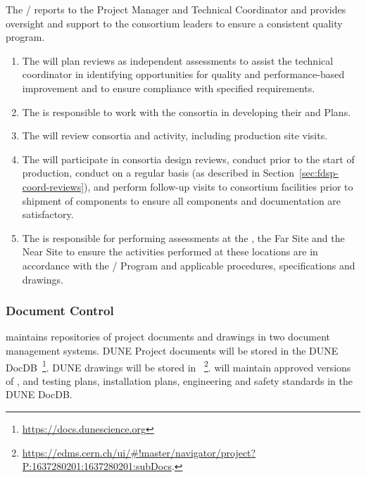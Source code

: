 The /  reports
to the  Project Manager and  Technical
Coordinator and provides oversight and support to the consortium
leaders to ensure a consistent quality program.
\begin{enumerate}
  \item The  will plan reviews as independent assessments to assist
    the technical coordinator in identifying opportunities for
    quality and performance-based improvement and to ensure compliance
    with specified requirements.
  \item The  is responsible to work with the consortia in
    developing their  and  Plans.
  \item The  will review consortia  and  activity, including
    production site visits.
  \item The  will participate in consortia design reviews, conduct
     prior to the start of production,
    conduct  on a regular basis (as
    described in Section~\ref{sec:fdsp-coord-reviews}), and perform
    follow-up visits to consortium facilities prior to shipment of
    components to ensure all components and documentation are
    satisfactory.
\item The  is responsible for performing assessments at the
  , the Far Site and the Near Site to
  ensure the activities performed at these locations are in accordance
  with the /  Program and applicable procedures,
  specifications and drawings.
\end{enumerate}

\subsubsection{Document Control}
\label{sec:fdsp-coord-document}

 maintains repositories of project documents and drawings in two
document management systems.  DUNE Project documents will be stored in
the DUNE DocDB~\footnote{\url{https://docs.dunescience.org}}. DUNE drawings
will be stored in 
~\footnote{\url{https://edms.cern.ch/ui/\#!master/navigator/project?P:1637280201:1637280201:subDocs}.}.
 will maintain approved versions of ,  and testing plans,
installation plans, engineering and safety standards in the DUNE
DocDB.

